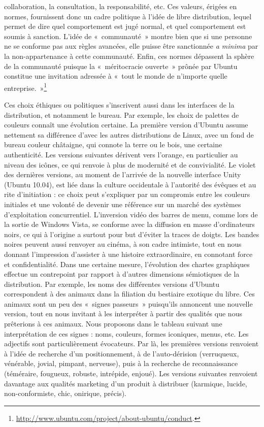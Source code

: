\documentclass{FramateX}
\begin{document}
\begin{refsection}
collaboration, la consultation, la responsabilité, etc. Ces valeurs,
érigées en normes, fournissent donc un cadre politique à l'idée de
libre distribution, lequel permet de dire quel comportement est jugé
normal, et quel comportement est soumis à sanction. L'idée de
«~communauté~» montre bien que si une personne ne se conforme pas aux
règles avancées, elle puisse être sanctionnée \textit{a minima} par la
non-appartenance à cette communauté. Enfin, ces normes dépassent la
sphère de la communauté puisque la «~méritocracie ouverte~» prônée par
Ubuntu constitue une invitation adressée à «~tout le monde de n'importe
quelle
entreprise.~»\footnote{\url{http://www.ubuntu.com/project/about-ubuntu/conduct}.}

Ces choix éthiques ou politiques s'inscrivent aussi dans les interfaces
de la distribution, et notamment le bureau. Par exemple, les choix de
palettes de couleurs connaît une évolution certaine. La première
version d'Ubuntu assume nettement sa différence d'avec les autres
distributions de Linux, avec un fond de bureau couleur châtaigne, qui
connote la terre ou le bois, une certaine authenticité. Les versions
suivantes dérivent vers l'orange, en particulier au niveau des icônes,
ce qui renvoie à plus de modernité et de convivialité. Le violet des
dernières versions, au moment de l'arrivée de la nouvelle interface
Unity (Ubuntu 10.04), est liée dans la culture occidentale à l'autorité
des évêques et au rite d'initiation : ce choix peut s'expliquer par un
compromis entre les couleurs initiales et une volonté de devenir une
référence sur un marché des systèmes d'exploitation concurrentiel.
L'inversion vidéo des barres de menu, comme lors de la sortie de
Windows Vista, se conforme avec la diffusion en masse d'ordinateurs
noirs, ce qui à l'origine a surtout pour but d'éviter la traces de
doigts. Les bandes noires peuvent aussi renvoyer au cinéma, à son cadre
intimiste, tout en nous donnant l'impression d'assister à une histoire
extraordinaire, en connotant force et confidentialité. Dans une
certaine mesure, l'évolution des chartes graphiques effectue un
contrepoint par rapport à d'autres dimensions sémiotiques de la
distribution. Par exemple, les noms des différentes versions d'Ubuntu
correspondent à des animaux dans la filiation du bestiaire exotique du
libre. Ces animaux sont un peu des «~signes passeurs~» puisqu'ils
annoncent une nouvelle version, tout en nous invitant à les interpréter
à partir des qualités que nous prêterions à ces animaux. Nous proposons
dans le tableau suivant une interprétation de ces signes : noms,
couleurs, formes iconiques, menus, etc. Les adjectifs sont
particulièrement évocateurs. Par là, les premières versions renvoient à
l'idée de recherche d'un positionnement, à de l'auto-dérision
(verruqueux, vénérable, jovial, pimpant, nerveuse), puis à la recherche
de reconnaissance (téméraire, fougueux, robuste, intrépide, enjoué).
Les versions suivantes renvoient davantage aux qualités marketing d'un
produit à distribuer (karmique, lucide, non-conformiste, chic,
onirique, précis). 


\end{refsection}
\end{document}
